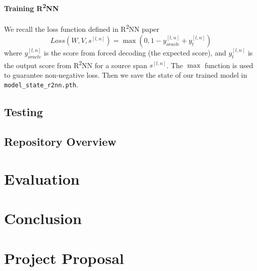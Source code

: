 \documentclass[12pt,a4paper,twoside,openright]{report}
\begin{document}
\subsubsection{Training \texorpdfstring{R\textsuperscript{2}NN}{R2NN}}
We recall the loss function defined in R\textsuperscript{2}NN paper\cite{r2nn}
\[Loss(W,V,s^{[l,n]}) = \max{(0, 1-y_{oracle}^{[l,n]} + y_t^{[l,n]})} \]
where $y_{oracle}^{[l,n]}$ is the score from forced decoding (the expected score), and $y_t^{[l,n]}$ is the output score from R\textsuperscript{2}NN for a source span $s^{[l,n]}$. The $\max$ function is used to guarantee non-negative loss. Then we save the state of our trained model in \texttt{model\_state\_r2nn.pth}.

\section{Testing}

\section{Repository Overview}

\chapter{Evaluation}

\chapter{Conclusion}




\appendix

\chapter{Project Proposal}


\end{document}
